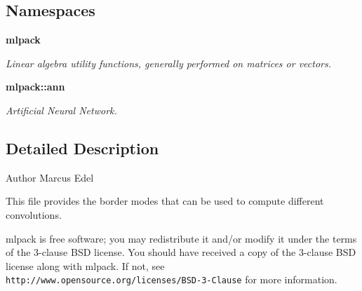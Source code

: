 \subsection*{Namespaces}
\begin{DoxyCompactItemize}
\item 
 \textbf{ mlpack}
\begin{DoxyCompactList}\small\item\em Linear algebra utility functions, generally performed on matrices or vectors. \end{DoxyCompactList}\item 
 \textbf{ mlpack\+::ann}
\begin{DoxyCompactList}\small\item\em Artificial Neural Network. \end{DoxyCompactList}\end{DoxyCompactItemize}


\subsection{Detailed Description}
\begin{DoxyAuthor}{Author}
Marcus Edel
\end{DoxyAuthor}
This file provides the border modes that can be used to compute different convolutions.

mlpack is free software; you may redistribute it and/or modify it under the terms of the 3-\/clause B\+SD license. You should have received a copy of the 3-\/clause B\+SD license along with mlpack. If not, see {\tt http\+://www.\+opensource.\+org/licenses/\+B\+S\+D-\/3-\/\+Clause} for more information. 